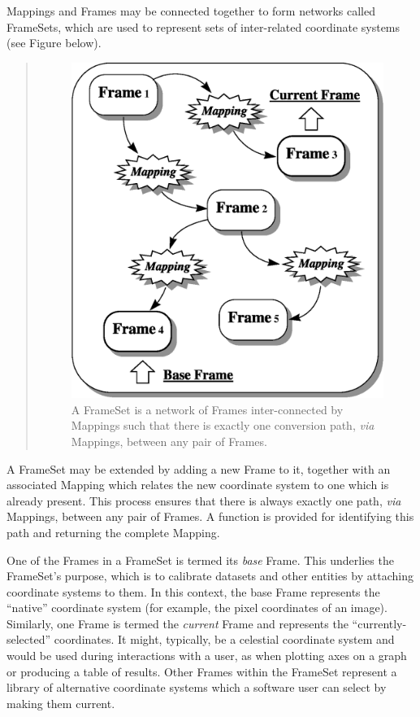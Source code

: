 \documentclass[twoside,11pt]{article}
\newcommand{\htmlref}[2]{#1}
\begin{document}
\begin{htmlonly}
   Mappings and Frames may be connected together to form networks called
   FrameSets, which are used to represent sets of inter-related
   coordinate systems (see Figure below).
   \begin{quote}
   \begin{figure}
   \label{fig:frameset}
   \includegraphics[scale=1.0]{sun210_figures/frameset.eps}
   \caption{A FrameSet is a network of Frames inter-connected by Mappings
   such that there is exactly one conversion path, {\em{via}} Mappings,
   between any pair of Frames.}
   \end{figure}
   \end{quote}
\end{htmlonly}
A FrameSet may be extended by adding a new \htmlref{Frame}{Frame} to it, together with
an associated \htmlref{Mapping}{Mapping} which relates the new coordinate system to one
which is already present.  This process ensures that there is always
exactly one path, {\em{via}} Mappings, between any pair of Frames.  A
function is provided for identifying this path and returning the
complete Mapping.

One of the Frames in a FrameSet is termed its {\em{base}} Frame.  This
underlies the FrameSet's purpose, which is to calibrate datasets and
other entities by attaching coordinate systems to them.  In this
context, the base Frame represents the ``native'' coordinate system
(for example, the pixel coordinates of an image).  Similarly, one
Frame is termed the {\em{current}} Frame and represents the
``currently-selected'' coordinates.  It might, typically, be a
celestial coordinate system and would be used during interactions with
a user, as when plotting axes on a graph or producing a table of
results.  Other Frames within the FrameSet represent a library of
alternative coordinate systems which a software user can select by
making them current.
\end{document}
